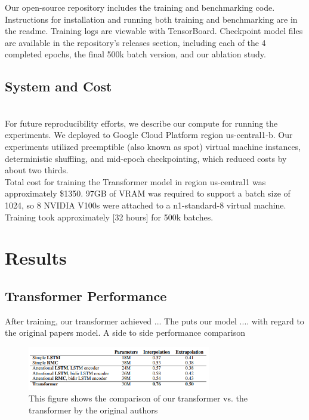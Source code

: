 Our open-source repository\supercite{hs-math-nlp} includes the training and benchmarking code. Instructions for installation and running both training and benchmarking are in the readme. Training logs are viewable with TensorBoard\supercite{tensorboard}. Checkpoint model files are available in the repository's releases section, including each of the 4 completed epochs, the final 500k batch version, and our ablation study. \\

\subsection{System and Cost} \\

For future reproducibility efforts, we describe our compute for running the experiments. We deployed to Google Cloud Platform region us-central1-b. Our experiments utilized preemptible (also known as spot) virtual machine instances, deterministic shuffling, and mid-epoch checkpointing, which reduced costs by about two thirds. \\

Total cost for training the Transformer model in region us-central1 was approximately \$1350. 97GB of VRAM was required to support a batch size of 1024, so 8 NVIDIA V100s were attached to a n1-standard-8 virtual machine. Training took approximately [32 hours] for 500k batches. \\



\section{Results}

\subsection{Transformer Performance}


After training, our transformer achieved ... The puts our model .... with regard to the original papers model. A side to side performance comparison 


\begin{figure}[h]
\includegraphics[width=8cm]{images/test_image.PNG}
\centering
\caption{This figure shows the comparison of our transformer vs. the transformer by the original authors}

\end{figure}

